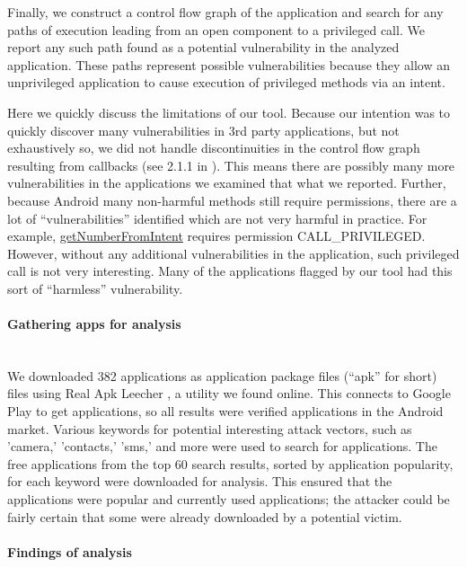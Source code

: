 \documentclass[12pt,a4paper]{article}
\begin{document}
Finally, we construct a control flow graph of the application and search for any
paths of execution leading from an open component to a privileged call. We
report any such path found as a potential vulnerability in the analyzed
application. These paths represent possible vulnerabilities because they allow
an unprivileged application to cause execution of privileged methods via an
intent.

Here we quickly discuss the limitations of our tool. Because our intention was
to quickly discover many vulnerabilities in 3rd party applications, but not
exhaustively so, we did not handle discontinuities in the control flow graph
resulting from callbacks (see 2.1.1 in \cite{grace_systematic_2012}). This means
there are possibly many more vulnerabilities in the applications we examined
that what we reported. Further, because Android many non-harmful methods still
require permissions, there are a lot of ``vulnerabilities'' identified which are
not very harmful in practice. For example,
\href{https://developer.android.com/reference/android/telephony/PhoneNumberUtils.html#getNumberFromIntent\%28android.content.Intent,\%20android.content.Context\%29}{getNumberFromIntent}
 requires permission CALL\_PRIVILEGED. However, without any additional
 vulnerabilities in the application, such privileged call is not very
 interesting. Many of the applications flagged by our tool had this sort of
 ``harmless'' vulnerability.

\paragraph{Gathering apps for analysis} ~\\

We downloaded 382 applications as application package files (``apk'' for short)
files using Real Apk Leecher \cite{apkleecher}, a utility we found online. This
connects to Google Play to get applications, so all results were verified
applications in the Android market. Various keywords for potential interesting
attack vectors, such as 'camera,' 'contacts,' 'sms,' and more were used to
search for applications. The free applications from the top 60 search results,
sorted by application popularity, for each keyword were downloaded for analysis.
This ensured that the applications were popular and currently used applications;
the attacker could be fairly certain that some were already downloaded by a
potential victim.

\paragraph{Findings of analysis} ~\\
\end{document}
